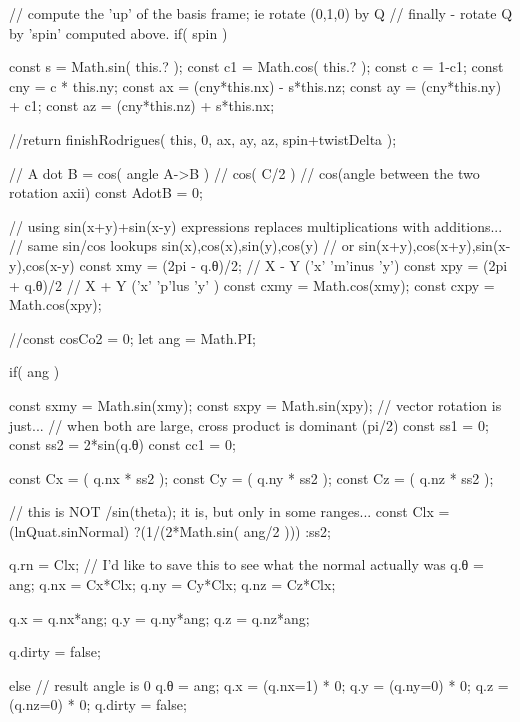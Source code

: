 	// compute the 'up' of the basis frame; ie rotate (0,1,0) by Q
	// finally - rotate Q by 'spin' computed above.
        if( spin )
	{
		const s = Math.sin( this.? );
		const c1 = Math.cos( this.? );
		const c = 1-c1;
		const cny = c * this.ny;
		const ax = (cny*this.nx) - s*this.nz;
		const ay = (cny*this.ny) + c1;
		const az = (cny*this.nz) + s*this.nx;
		
		//return finishRodrigues( this, 0, ax, ay, az, spin+twistDelta );
                
                
                
	// A dot B   = cos( angle A->B )
	// cos( C/2 ) 
	//  cos(angle between the two rotation axii)
	const AdotB = 0;

	// using sin(x+y)+sin(x-y)  expressions replaces multiplications with additions...
	// same sin/cos lookups sin(x),cos(x),sin(y),cos(y)  
	//   or sin(x+y),cos(x+y),sin(x-y),cos(x-y)
	const xmy = (2pi - q.θ)/2; // X - Y  ('x' 'm'inus 'y')
	const xpy = (2pi + q.θ)/2  // X + Y  ('x' 'p'lus 'y' )
	const cxmy = Math.cos(xmy);
	const cxpy = Math.cos(xpy);

	//const cosCo2 =  0;
	let ang = Math.PI;

	if( ang ) {
		const sxmy = Math.sin(xmy);
		const sxpy = Math.sin(xpy);
		// vector rotation is just...
		// when both are large, cross product is dominant (pi/2)
		const ss1 = 0;
		const ss2 = 2*sin(q.θ)
		const cc1 = 0;

		const Cx = ( q.nx * ss2 );
		const Cy = ( q.ny * ss2 );
		const Cz = ( q.nz * ss2 );

		// this is NOT /sin(theta);  it is, but only in some ranges...
		const Clx = (lnQuat.sinNormal)
		          ?(1/(2*Math.sin( ang/2 )))
		          :ss2;
                          
		q.rn = Clx; // I'd like to save this to see what the normal actually was
		q.θ  = ang;
		q.nx = Cx*Clx;
		q.ny = Cy*Clx;
		q.nz = Cz*Clx;

		q.x  = q.nx*ang;
		q.y  = q.ny*ang;
		q.z  = q.nz*ang;

		q.dirty = false;
	} else {
		// result angle is 0
		q.θ  = ang;
		q.x = (q.nx=1) * 0;
		q.y = (q.ny=0) * 0;
		q.z = (q.nz=0) * 0;
		q.dirty = false;
	}
                
                
	}



